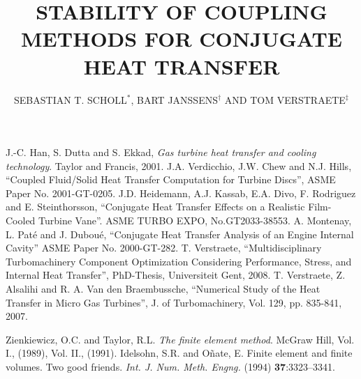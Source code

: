 \documentclass{coupled}
\title{STABILITY OF COUPLING METHODS FOR CONJUGATE HEAT TRANSFER}
\author{SEBASTIAN T. SCHOLL$^{*}$, BART JANSSENS$^{\dag}$ AND TOM VERSTRAETE$^{\ddag}$}
\begin{document}












\begin{thebibliography}{99}

 J.-C. Han, S. Dutta and S. Ekkad, \textit{Gas turbine heat transfer and cooling technology}. Taylor and Francis, 2001.
 J.A. Verdicchio, J.W. Chew and N.J. Hills, “Coupled Fluid/Solid Heat Transfer Computation for Turbine Discs”, ASME Paper No. 2001-GT-0205.
 J.D. Heidemann, A.J. Kassab, E.A. Divo, F. Rodriguez and E. Steinthorsson, “Conjugate Heat Transfer Effects on a Realistic Film-Cooled Turbine Vane”. ASME TURBO EXPO, No.GT2033-38553.
 A. Montenay, L. Paté and J. Duboué, “Conjugate Heat Transfer Analysis of an Engine Internal Cavity” ASME Paper No. 2000-GT-282.
 T. Verstraete, “Multidisciplinary Turbomachinery Component Optimization Considering Performance, Stress, and Internal Heat Transfer”, PhD-Thesis, Universiteit Gent, 2008.
 T. Verstraete, Z. Alsalihi and R. A. Van den Braembussche, “Numerical Study of the Heat Transfer in Micro Gas Turbines”, J. of Turbomachinery, Vol. 129, pp. 835-841, 2007.

  Zienkiewicz, O.C. and  Taylor, R.L. \textit{The finite element method}. McGraw Hill,
Vol. I., (1989), Vol. II., (1991).
 Idelsohn, S.R. and O\~{n}ate, E. Finite element and finite volumes. Two good friends.
\textit{Int. J. Num. Meth. Engng.} (1994) \textbf{37}:3323--3341.

\end{thebibliography}
\end{document}
